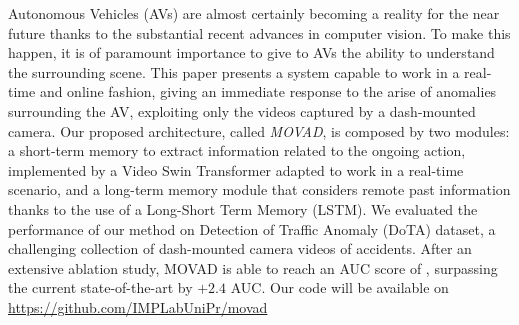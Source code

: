 Autonomous Vehicles (AVs) are almost certainly becoming a reality for the near future thanks to the substantial recent advances in computer vision.
To make this happen, it is of paramount importance to give to AVs the ability to understand the surrounding scene.
This paper presents a system capable to work in a real-time and online fashion, giving an immediate response to the arise of anomalies surrounding the AV, exploiting only the videos captured by a dash-mounted camera.
Our proposed architecture, called \emph{MOVAD}, is composed by two modules: a short-term memory to extract information related to the ongoing action, implemented by a Video Swin Transformer adapted to work in a real-time scenario, and a long-term memory module that considers remote past information thanks to the use of a Long-Short Term Memory (LSTM).
We evaluated the performance of our method on Detection of Traffic Anomaly (DoTA) dataset, a challenging collection of dash-mounted camera videos of accidents.
After an extensive ablation study, MOVAD is able to reach an AUC score of , surpassing the current state-of-the-art by $+2.4$ AUC.
Our code will be available on \url{https://github.com/IMPLabUniPr/movad}